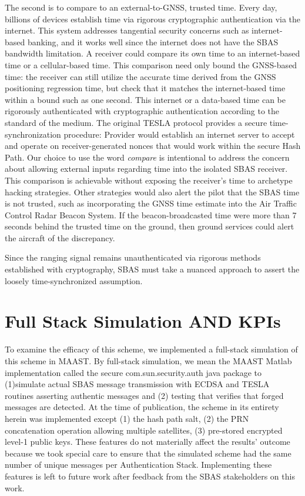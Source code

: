 \documentclass[letterpaper,times]{IONconf/IONconf}
\begin{document}
	The second is to compare to an external-to-GNSS, trusted time.
	Every day, billions of devices establish time via rigorous cryptographic authentication via the internet.
	This system addresses tangential security concerns such as internet-based banking, and it works well since the internet does not have the SBAS bandwidth limitation.
	A receiver could compare its own time to an internet-based time or a cellular-based time.
	This comparison need only bound the GNSS-based time: the receiver can still utilize the accurate time derived from the GNSS positioning regression time, but check that it matches the internet-based time within a bound such as one second.
	This internet or a data-based time can be rigorously authenticated with cryptographic authentication according to the standard of the medium.
	The original TESLA protocol provides a secure time-synchronization procedure: Provider would establish an internet server to accept and operate on receiver-generated nonces that would work within the secure Hash Path\cite{perrig2005timed}.
	Our choice to use the word {\em compare} is intentional to address the concern about allowing external inputs regarding time into the isolated SBAS receiver.
	This comparison is achievable without exposing the receiver's time to archetype hacking strategies.
	Other strategies would also alert the pilot that the SBAS time is not trusted, such as incorporating the GNSS time estimate into the Air Traffic Control Radar Beacon System.
	If the beacon-broadcasted time were more than 7 seconds behind the trusted time on the ground, then ground services could alert the aircraft of the discrepancy.

	Since the ranging signal remains unauthenticated via rigorous methods established with cryptography, SBAS must take a nuanced approach to assert the loosely time-synchronized assumption.

\section{Full Stack Simulation AND KPIs} \label{sec:full_stack_simulation}

	To examine the efficacy of this scheme, we implemented a full-stack simulation of this scheme in MAAST.
	By full-stack simulation, we mean the MAAST Matlab implementation called the secure com.sun.security.auth java package to (1)simulate actual SBAS message transmission with ECDSA and TESLA routines asserting authentic messages and (2) testing that verifies that forged messages are detected.
	At the time of publication, the scheme in its entirety herein was implemented except (1) the hash path salt, (2) the PRN concatenation operation allowing multiple satellites, (3) pre-stored encrypted level-1 public keys.
	These features do not materially affect the results' outcome because we took special care to ensure that the simulated scheme had the same number of unique messages per Authentication Stack.
	Implementing these features is left to future work after feedback from the SBAS stakeholders on this work.
\end{document}

